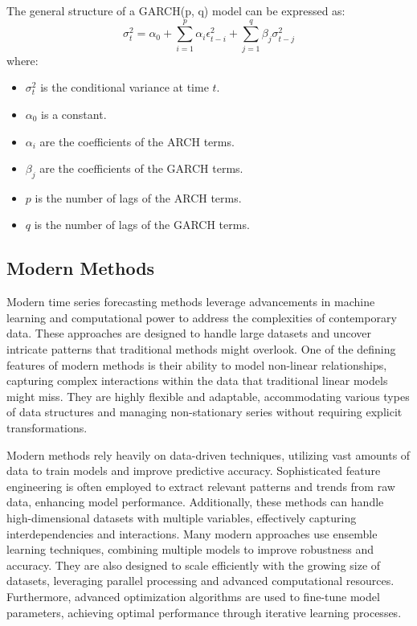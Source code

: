 The general structure of a GARCH(p, q) model can be expressed as:
\[
\sigma_t^2 = \alpha_0 + \sum_{i=1}^p \alpha_i \epsilon_{t-i}^2 + \sum_{j=1}^q \beta_j \sigma_{t-j}^2
\]
where:
\begin{itemize}
    \item \( \sigma_t^2 \) is the conditional variance at time \( t \).
    \item \( \alpha_0 \) is a constant.
    \item \( \alpha_i \) are the coefficients of the ARCH terms.
    \item \( \beta_j \) are the coefficients of the GARCH terms.
    \item \( p \) is the number of lags of the ARCH terms.
    \item \( q \) is the number of lags of the GARCH terms.
\end{itemize}
\vspace{10pt}



\subsection{Modern Methods}

Modern time series forecasting methods leverage advancements in machine learning and computational power to address the complexities of contemporary data. These approaches are designed to handle large datasets and uncover intricate patterns that traditional methods might overlook. One of the defining features of modern methods is their ability to model non-linear relationships, capturing complex interactions within the data that traditional linear models might miss. They are highly flexible and adaptable, accommodating various types of data structures and managing non-stationary series without requiring explicit transformations.

Modern methods rely heavily on data-driven techniques, utilizing vast amounts of data to train models and improve predictive accuracy. Sophisticated feature engineering is often employed to extract relevant patterns and trends from raw data, enhancing model performance. Additionally, these methods can handle high-dimensional datasets with multiple variables, effectively capturing interdependencies and interactions. Many modern approaches use ensemble learning techniques, combining multiple models to improve robustness and accuracy. They are also designed to scale efficiently with the growing size of datasets, leveraging parallel processing and advanced computational resources. Furthermore, advanced optimization algorithms are used to fine-tune model parameters, achieving optimal performance through iterative learning processes.
\vspace{10pt}


